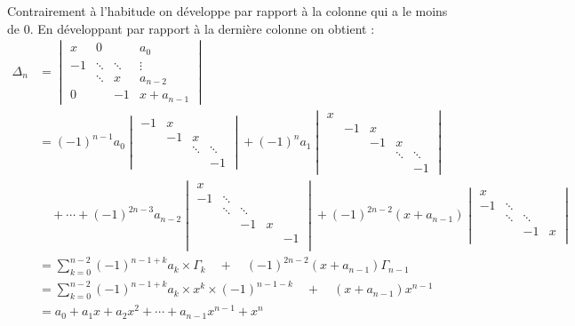 {{Contrairement à l'habitude on développe par rapport à la colonne qui a le moins de $0$.
En développant par rapport à la dernière colonne on obtient :
{\footnotesize
\begin{align*}
 \Delta_{n}
& =
   \begin{vmatrix}
   x &  0    &        & a_{0}   \\
    -1 &\ddots &\ddots  &\vdots  \\
      &\ddots &x      & a_{n-2} \\
    0 &       & -1      & x+a_{n-1}
   \end{vmatrix} \\
 & = (-1)^{n-1} a_0 
   \begin{vmatrix}
   -1 &  x    &        &    \\
     & -1 & x  &  \\
      & & \ddots & \ddots       \\
     &       &       & -1
   \end{vmatrix}
+ (-1)^{n} a_1   
\begin{vmatrix}
   x & &&&\\
   & -1 &  x    &        &    \\
   &  & -1 & x  &  \\
    &  & & \ddots & \ddots       \\
    & &       &       & -1
   \end{vmatrix} 
\\
& \quad + \cdots +
(-1)^{2n-3} a_{n-2}   
\begin{vmatrix}
  x &      &    & &      \\
    -1 &\ddots &  & & \\
     &\ddots &\ddots & &  \\
      && -1 & x    &   \\
    &&&& -1 \\
   \end{vmatrix}
+ (-1)^{2n-2}(x+a_{n-1})
\begin{vmatrix}
  x &      &    &       \\
    -1 &\ddots &  &  \\
     &\ddots &\ddots &   \\
    &  & -1 & x       \\
   \end{vmatrix} \\
 & = \sum_{k=0}^{n-2} (-1)^{n-1+k} a_ k \times \Gamma_k \quad  + \quad (-1)^{2n-2}(x+a_{n-1})\Gamma_{n-1} \\
 & = \sum_{k=0}^{n-2} (-1)^{n-1+k} a_ k \times x^k\times (-1)^{n-1-k} \quad + \quad (x+a_{n-1})x^{n-1}\\
 & = a_0+a_1x+a_2x^2+\cdots + a_{n-1}x^{n-1} + x^n\\
\end{align*}
}}
}